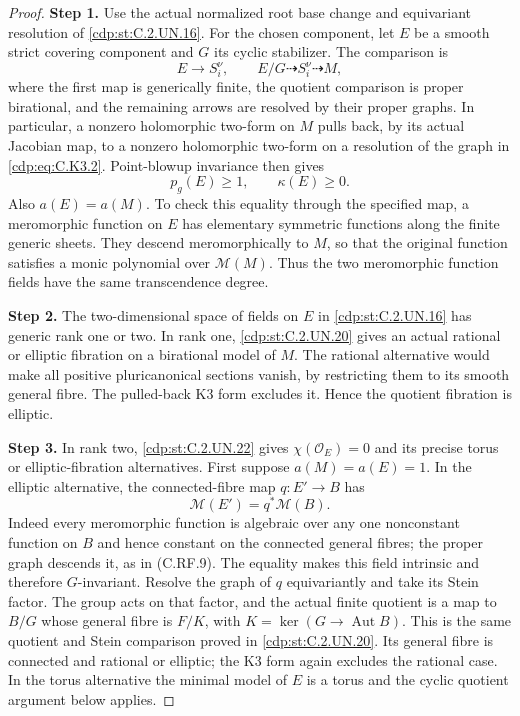 \begin{proof}
\noindent\textbf{Step 1.} Use the actual normalized root base change and equivariant
resolution of \ref{cdp:st:C.2.UN.16}. For the chosen component, let $E$
be a smooth strict covering component and $G$ its cyclic
stabilizer. The comparison is
\[
 E\longrightarrow S_i^\nu,
 \qquad E/G\dashrightarrow S_i^\nu\dashrightarrow M,
                                                               \tag{C.K3.2}\label{cdp:eq:C.K3.2}
\]
where the first map is generically finite, the quotient
comparison is proper birational, and the remaining arrows
are resolved by their proper graphs. In particular, a
nonzero holomorphic two-form on $M$ pulls back, by its
actual Jacobian map, to a nonzero holomorphic two-form on
a resolution of the graph in \eqref{cdp:eq:C.K3.2}. Point-blowup
invariance then gives
\[
                  p_g(E)\ge1,\qquad \kappa(E)\ge0.
                                                               \tag{C.K3.3}\label{cdp:eq:C.K3.3}
\]
Also $a(E)=a(M)$. To check this equality through the
specified map, a meromorphic function on $E$ has elementary
symmetric functions along the finite generic sheets.
They descend meromorphically to $M$, so that the original
function satisfies a monic polynomial over $\mathcal M(M)$.
Thus the two meromorphic function fields have the same
transcendence degree.

\noindent\textbf{Step 2.} The two-dimensional space of fields on $E$ in \ref{cdp:st:C.2.UN.16}
has generic rank one or two. In rank one, \ref{cdp:st:C.2.UN.20} gives
an actual rational or elliptic fibration on a birational
model of $M$. The rational alternative would make all
positive pluricanonical sections vanish, by restricting
them to its smooth general fibre. The pulled-back K3
form excludes it. Hence the quotient fibration is elliptic.

\noindent\textbf{Step 3.} In rank two, \ref{cdp:st:C.2.UN.22} gives $\chi(\mathcal O_E)=0$ and
its precise torus or elliptic-fibration alternatives.
First suppose $a(M)=a(E)=1$. In the elliptic alternative,
the connected-fibre map $q:E'\to B$ has
\[
                     \mathcal M(E')=q^*\mathcal M(B).
                                                               \tag{C.K3.4}\label{cdp:eq:C.K3.4}
\]
Indeed every meromorphic function is algebraic over any
one nonconstant function on $B$ and hence constant on
the connected general fibres; the proper graph descends
it, as in (C.RF.9). The equality makes this field
intrinsic and therefore $G$-invariant. Resolve the graph
of $q$ equivariantly and take its Stein factor. The group
acts on that factor, and the actual finite quotient is a
map to $B/G$ whose general fibre is $F/K$, with
$K=\ker(G\to\operatorname{Aut}B)$. This is the same
quotient and Stein comparison proved in \ref{cdp:st:C.2.UN.20}.
Its general fibre is connected and rational or elliptic;
the K3 form again excludes the rational case. In the
torus alternative the minimal model of $E$ is a torus
and the cyclic quotient argument below applies.


\end{proof}
